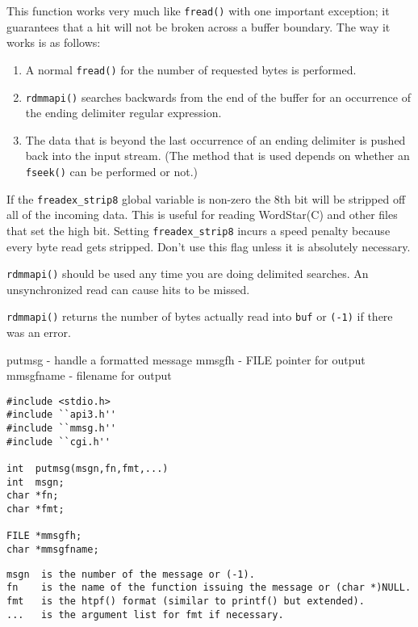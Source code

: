 This function works very much like \verb`fread()` with one important
exception; it guarantees that a hit will not be broken across a
buffer boundary.  The way it works is as follows:
\begin{enumerate}
\item A normal \verb`fread()` for the number of requested bytes is performed.

\item \verb`rdmmapi()` searches backwards from the end of the buffer for
an occurrence of the ending delimiter regular expression.

\item The data that is beyond the last occurrence of an ending delimiter
is pushed back into the input stream. (The method that is used
depends on whether an \verb`fseek()` can be performed or not.)
\end{enumerate}

If the \verb`freadex_strip8` global variable is non-zero the 8th bit will
be stripped off all of the incoming data.  This is useful for
reading WordStar(C) and other files that set the high bit.
Setting \verb`freadex_strip8` incurs a speed penalty because every byte
read gets stripped.  Don't use this flag unless it is absolutely
necessary.

\verb`rdmmapi()` should be used any time you are doing delimited
searches.  An unsynchronized read can cause hits to be missed.

\DIAGNOSTICS

\verb`rdmmapi()` returns the number of bytes actually read into \verb`buf` or
\verb`(-1)` if there was an error.

\NAME
{putmsg    - handle a formatted message
mmsgfh    - FILE pointer for output
mmsgfname - filename for output}

\SYNOPSIS
\begin{verbatim}
#include <stdio.h>
#include ``api3.h''
#include ``mmsg.h''
#include ``cgi.h''

int  putmsg(msgn,fn,fmt,...)
int  msgn;
char *fn;
char *fmt;

FILE *mmsgfh;
char *mmsgfname;

\end{verbatim}

\DESCRIPTION
\begin{verbatim}
msgn  is the number of the message or (-1).
fn    is the name of the function issuing the message or (char *)NULL.
fmt   is the htpf() format (similar to printf() but extended).
...   is the argument list for fmt if necessary.
\end{verbatim}

